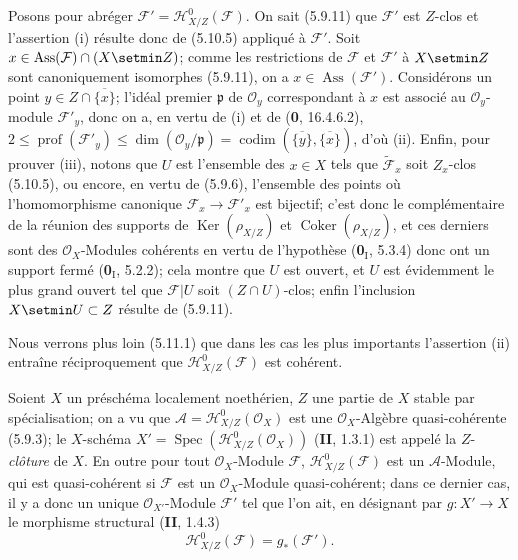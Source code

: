 Posons pour abréger $\mathcal F'=\mathcal H^0_{X/Z}(\mathcal F)$. On sait
(5.9.11) que $\mathcal F'$ est $Z$-clos et l'assertion (i) résulte donc de
(5.10.5) appliqué à $\mathcal F'$. Soit
$x\in\operatorname{Ass}(\mathcal F)\cap(X\setmin Z)$; comme les restrictions de
$\mathcal F$ et $\mathcal F'$ à $X\setmin Z$ sont canoniquement isomorphes (5.9.11),
on a $x\in\operatorname{Ass}(\mathcal F')$. Considérons un point
$y\in Z\cap\overline{\{x\}}$; l'idéal premier $\mathfrak p$ de
$\mathcal O_y$ correspondant à $x$ est associé au $\mathcal O_y$-module
$\mathcal F'_y$, donc on a, en vertu de (i) et de (\textbf{0}, 16.4.6.2),
$2\leq\operatorname{prof}(\mathcal F'_y)
\leq\dim(\mathcal O_y/\mathfrak p)
=\operatorname{codim}(\overline{\{y\}},\overline{\{x\}})$,
d'où (ii). Enfin, pour prouver (iii), notons que $U$ est l'ensemble des
$x\in X$ tels que $\widetilde{\mathcal F}_x$ soit $Z_x$-clos (5.10.5), ou
encore, en vertu de (5.9.6), l'ensemble des points où l'homomorphisme
canonique $\mathcal F_x\to\mathcal F'_x$ est bijectif; c'est donc le
complémentaire de la réunion des supports de $\operatorname{Ker}(\rho_{X/Z})$
et $\operatorname{Coker}(\rho_{X/Z})$, et ces derniers sont des
$\mathcal O_X$-Modules cohérents en vertu de l'hypothèse (\textbf{0}$_\mathrm I$,
5.3.4) donc ont un support fermé (\textbf{0}$_\mathrm I$, 5.2.2); cela montre que $U$
est ouvert, et $U$ est évidemment le plus grand ouvert tel que $\mathcal F|U$
soit $(Z\cap U)$-clos; enfin l'inclusion $X\setmin U\subset Z$ résulte de (5.9.11).

Nous verrons plus loin (5.11.1) que dans les cas les plus importants
l'assertion (ii) entraîne réciproquement que
$\mathcal H^0_{X/Z}(\mathcal F)$ est cohérent.

\begin{env}[5.10.11]
\label{IV.2.s5.10.11-fr}
Soient $X$ un préschéma localement noethérien, $Z$ une partie de $X$ stable
par spécialisation; on a vu que
$\mathcal A=\mathcal H^0_{X/Z}(\mathcal O_X)$ est une
$\mathcal O_X$-Algèbre quasi-cohérente (5.9.3); le $X$-schéma
$X'=\operatorname{Spec}(\mathcal H^0_{X/Z}(\mathcal O_X))$ (\textbf{II}, 1.3.1) est
appelé la $Z$-\emph{clôture} de $X$. En outre pour tout $\mathcal O_X$-Module
$\mathcal F$, $\mathcal H^0_{X/Z}(\mathcal F)$ est un $\mathcal A$-Module,
qui est quasi-cohérent si $\mathcal F$ est un $\mathcal O_X$-Module
quasi-cohérent; dans ce dernier cas, il y a donc un unique
$\mathcal O_{X'}$-Module $\mathcal F'$ tel que l'on ait, en désignant par
$g:X'\to X$ le morphisme structural (\textbf{II}, 1.4.3)
\begin{equation}
\mathcal H^0_{X/Z}(\mathcal F)=g_*(\mathcal F').
\tag{5.10.11.1}\label{IV.2.s5.10.11.1-fr}
\end{equation}
\end{env}

